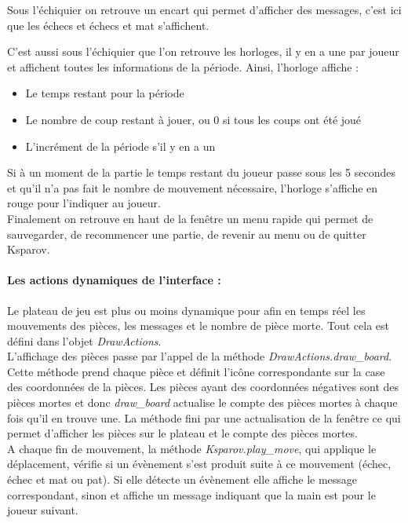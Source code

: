 \documentclass[a4paper]{article}
\begin{document}
Sous l'échiquier on retrouve un encart qui permet d'afficher des messages, c'est ici que les échecs et échecs et mat s'affichent.

C'est aussi sous l'échiquier que l'on retrouve les horloges, il y en a une par joueur et affichent toutes les informations de la période. Ainsi, l'horloge affiche :
\begin{itemize}
\item Le temps restant pour la période
\item Le nombre de coup restant à jouer, ou 0 si tous les coups ont été joué
\item L'incrément de la période s'il y en a un 
\end{itemize}

Si à un moment de la partie le temps restant du joueur passe sous les 5 secondes et qu'il n'a pas fait le nombre de mouvement nécessaire, l'horloge s'affiche en rouge pour l'indiquer au joueur. \\

Finalement on retrouve en haut de la fenêtre un menu rapide qui permet de sauvegarder, de recommencer une partie, de revenir au menu ou de quitter Ksparov.

\paragraph{Les actions dynamiques de l'interface :}Le plateau de jeu est plus ou moins dynamique pour afin en temps réel les mouvements des pièces, les messages et le nombre de pièce morte. Tout cela est défini dans l'objet \textit{DrawActions}. \\

L'affichage des pièces passe par l'appel de la méthode \textit{DrawActions.draw\_board}. Cette méthode prend chaque pièce et définit l'icône correspondante sur la case des coordonnées de la pièces. Les pièces ayant des coordonnées négatives sont des pièces mortes et donc \textit{draw\_board} actualise le compte des pièces mortes à chaque fois qu'il en trouve une. La méthode fini par une actualisation de la fenêtre ce qui permet d'afficher les pièces sur le plateau et le compte des pièces mortes. \\

A chaque fin de mouvement, la méthode \textit{Ksparov.play\_move}, qui applique le déplacement, vérifie si un évènement s'est produit suite à ce mouvement (échec, échec et mat ou pat). Si elle détecte un évènement elle affiche le message correspondant, sinon et affiche un message indiquant que la main est pour le joueur suivant. \\
\end{document}
